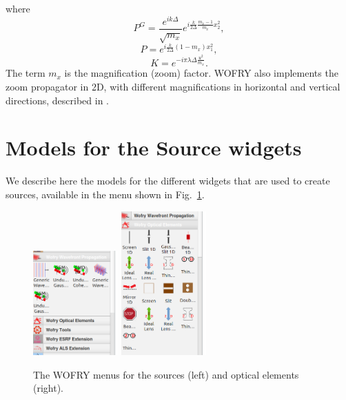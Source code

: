 \documentclass{iopconfser}
\begin{document}
where
\begin{equation}
P^G =  \frac { e^{ik\Delta }}{\sqrt{m_x} }e^{i \frac{k}{2 \Delta} \frac{m_x - 1}{m_x}x_2^2},
\end{equation}
\begin{equation}
P = e^{i \frac{k}{2\Delta} (1-m_x)x_1^2 },
\end{equation}
\begin{equation}
K = e^{-i \pi \lambda \Delta \frac{u^2}{m_x} }.
\end{equation}
The term $m_x$ is the magnification (zoom) factor. WOFRY also implements the zoom propagator in 2D, with different magnifications in horizontal and vertical directions, described in \cite{pirro}.


\section{Models for the Source widgets}

We describe here the models for the different widgets that are used to create sources, available in the menu shown in Fig.~\ref{fig:oasysmenus}.

\begin{figure}
    \centering
    \includegraphics[width=0.29\textwidth]{figures/oasyssources.png}
    \includegraphics[width=0.29\textwidth]
    {figures/oasyselements.png}
        
    \caption{The WOFRY menus for the sources (left) and optical elements (right).}
    \label{fig:oasysmenus}
\end{figure}
\end{document}
